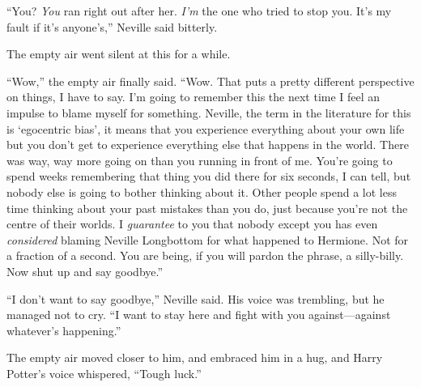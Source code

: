 “You? \emph{You} ran right out after her. \emph{I’m} the one who tried to stop you. It’s my fault if it’s anyone’s,” Neville said bitterly.

The empty air went silent at this for a while.

“Wow,” the empty air finally said. “Wow. That puts a pretty different perspective on things, I have to say. I’m going to remember this the next time I feel an impulse to blame myself for something. Neville, the term in the literature for this is ‘egocentric bias’, it means that you experience everything about your own life but you don’t get to experience everything else that happens in the world. There was way, way more going on than you running in front of me. You’re going to spend weeks remembering that thing you did there for six seconds, I can tell, but nobody else is going to bother thinking about it. Other people spend a lot less time thinking about your past mistakes than you do, just because you’re not the centre of their worlds. I \emph{guarantee} to you that nobody except you has even \emph{considered} blaming Neville Longbottom for what happened to Hermione. Not for a fraction of a second. You are being, if you will pardon the phrase, a silly-billy. Now shut up and say goodbye.”

“I don’t want to say goodbye,” Neville said. His voice was trembling, but he managed not to cry. “I want to stay here and fight with you against—against whatever’s happening.”

The empty air moved closer to him, and embraced him in a hug, and Harry Potter’s voice whispered, “Tough luck.”


